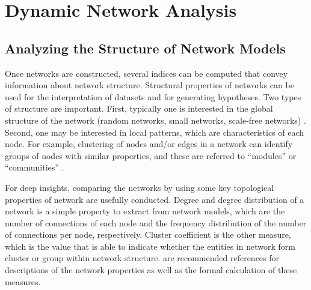 
\section*{Dynamic Network Analysis} %




\subsection*{Analyzing the Structure of Network Models}

Once networks are constructed, several indices can be computed that convey information about network structure. Structural properties of networks can be used for the interpretation of datasets and for generating hypotheses. Two types of structure are important. First, typically one is interested in the global structure of the network (random networks, small networks, scale-free networks) . Second, one may be interested in local patterns, which are characteristics of each node. For example, clustering of nodes and/or edges in a network can identify groups of nodes with similar properties, and these are referred to ``modules'' or ``communities''  .

For deep insights, comparing the networks by using some key topological properties of network are usefully conducted. Degree and degree distribution of a network is a simple property to extract from network models, which are the number of connections of each node and the frequency distribution of the number of connections per node, respectively. Cluster coefficient is the other measure, which is the value that is able to indicate whether the entities in network form cluster or group within network structure.  are recommended references for descriptions of the network properties as well as the formal calculation of these measures.


